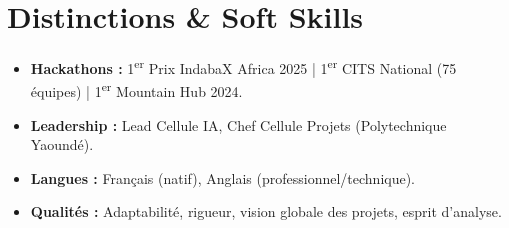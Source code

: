 \documentclass[a4paper,11pt]{article}
\begin{document}
\section{Distinctions \& Soft Skills}
\begin{itemize}[leftmargin=*, label=\tiny$\bullet$, nosep]
    \item \textbf{Hackathons :} 1\textsuperscript{er} Prix IndabaX Africa 2025 | 1\textsuperscript{er} CITS National (75 équipes) | 1\textsuperscript{er} Mountain Hub 2024.
    \item \textbf{Leadership :} Lead Cellule IA, Chef Cellule Projets (Polytechnique Yaoundé).
    \item \textbf{Langues :} Français (natif), Anglais (professionnel/technique).
    \item \textbf{Qualités :} Adaptabilité, rigueur, vision globale des projets, esprit d'analyse.
\end{itemize}
\end{document}
